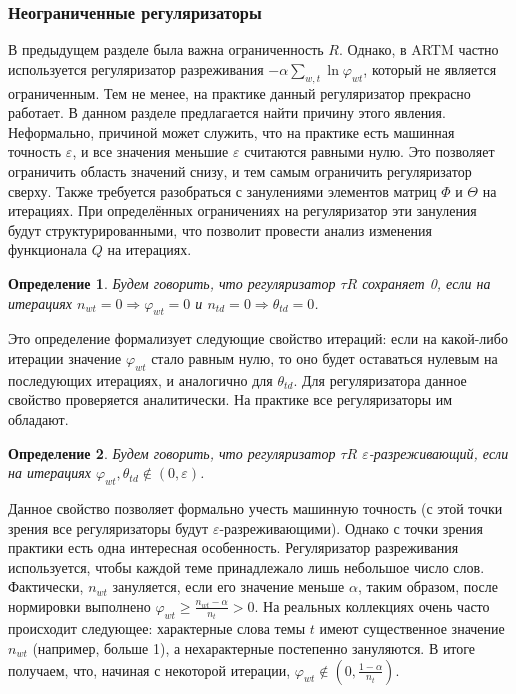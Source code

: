 \documentclass[12pt]{article}
\newtheorem{definition}{Определение}[section]
\renewcommand{\geq}{\geqslant}
\renewcommand{\phi}{\varphi}
\begin{document}
\subsubsection{Неограниченные регуляризаторы}
\label{subsec:unboundreg}
В предыдущем разделе была важна ограниченность $R$. Однако, в ARTM частно используется регуляризатор разреживания $- \alpha \sum_{w,t}\ln \phi_{wt}$, который не является ограниченным. Тем не менее,  на практике данный регуляризатор прекрасно работает. В данном разделе предлагается найти причину этого явления. Неформально, причиной может служить, что на практике есть машинная точность $\varepsilon$, и все значения меньшие $\varepsilon$ считаются равными нулю. Это позволяет ограничить область значений снизу, и тем самым ограничить регуляризатор сверху. Также требуется разобраться с занулениями элементов матриц $\Phi$ и $\Theta$ на итерациях. При определённых  ограничениях на регуляризатор эти зануления будут структурированными, что позволит провести анализ изменения функционала $Q$ на итерациях.
\begin{definition}
Будем говорить, что регуляризатор $\tau R$ сохраняет 0, если на итерациях $n_{wt} = 0 \Rightarrow \phi_{wt} = 0$ и $n_{td} = 0 \Rightarrow \theta_{td} = 0$.
\end{definition}

Это определение формализует следующие свойство итераций: если на какой-либо итерации значение $\phi_{wt}$ стало равным нулю, то оно будет оставаться нулевым на последующих итерациях, и аналогично для $\theta_{td}$. Для регуляризатора данное свойство проверяется аналитически. На практике все регуляризаторы им обладают.
\begin{definition}
\label{sparsereg}
Будем говорить, что регуляризатор $\tau R$ $\varepsilon$-разреживающий, если на итерациях $\phi_{wt}, \theta_{td} \notin (0, \varepsilon)$.
\end{definition}

Данное свойство позволяет формально учесть машинную точность (с этой точки зрения все регуляризаторы будут $\varepsilon$-разреживающими). Однако с точки зрения практики есть одна интересная особенность. Регуляризатор разреживания используется, чтобы каждой теме принадлежало лишь небольшое число слов. Фактически,  $n_{wt}$ зануляется, если его значение меньше $\alpha$, таким образом, после нормировки выполнено $\phi_{wt} \geq \frac{n_{wt} - \alpha}{n_t} > 0$.  На реальных коллекциях очень часто происходит следующее: характерные слова темы $t$ имеют существенное значение $n_{wt}$ (например, больше 1), а нехарактерные постепенно зануляются. В итоге получаем, что, начиная с некоторой итерации, $\phi_{wt} \notin (0, \frac{1-\alpha}{n_t})$.
\end{document}
